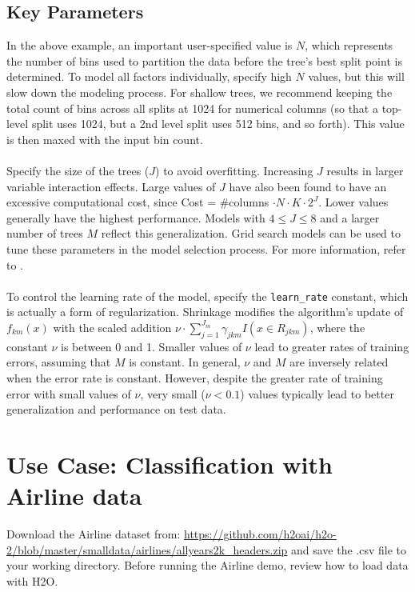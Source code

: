 \subsection{Key Parameters}
\label{ssec:Key parameters}

In the above example, an important user-specified value is $N$, which represents the number of bins used to partition the data before the tree's best split point is determined. To model all factors individually, specify high $N$ values, but this will slow down the modeling process. For shallow trees, we recommend keeping the total count of bins across all splits at 1024  for numerical columns (so that a top-level split uses 1024, but a 2nd level split uses 512 bins, and so forth). This value is then maxed with the input bin count.
\\
\\
Specify the size of the trees ($J$) to avoid overfitting. Increasing $J$ results in larger variable interaction effects. Large values of $J$ have also been found to have an excessive computational cost,
since Cost = \#columns $\cdot N \cdot K \cdot 2^{J}$. Lower values generally have the highest
performance. Models with $4 \leq J \leq 8$ and a larger number of trees $M$ reflect this generalization.
Grid search models can be used to tune these parameters in the model selection process. For more information, refer to . 
\\
\\
To control the learning rate of the model, specify the \texttt{learn\_rate} constant, which is actually a
form of regularization. Shrinkage modifies the algorithm's update of $f_{km}(x)$ with the scaled
addition $\nu \cdot \sum_{j=1}^{J_m} \gamma_{jkm} I(x \in R_{jkm})$, where the constant $\nu$ is between 0 and 1.
Smaller values of $\nu$ lead to greater rates of training errors, assuming that $M$ is constant. In general,
$\nu$ and $M$ are inversely related when the error rate is  constant.
However, despite the greater rate of training error with small values of $\nu$, very small ($\nu < 0.1$) values 
typically lead to better generalization and performance on test data.

\section{Use Case: Classification with Airline data}

Download the Airline dataset from: {\url{https://github.com/h2oai/h2o-2/blob/master/smalldata/airlines/allyears2k_headers.zip}} and save the .csv file to your working directory. Before running the Airline demo, review how to load data with H2O.

